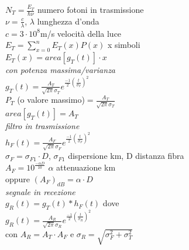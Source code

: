 \documentclass[a4paper]{article}
\begin{document}
\begin{multicols*}{3}
$N_T = \frac{E_T}{\hbar\nu}$ numero fotoni in trasmissione \\
$\nu = \frac{c}{\lambda}$, $\lambda$ lunghezza d'onda \\
$c=3\cdot10^8$m/s  velocità della luce \\
$E_T = \sum_{x=0}^{n}{E_T(x)P(x)}$ x simboli \\
$E_T(x) = area[g_T(t)]\cdot x$ \\
\textit{con potenza massima/varianza }\\
$g_T(t)=\frac{A_T}{\sqrt{2\pi}\sigma_T}e^{\frac{-1}{2}{(\frac{t}{\sigma_T})}^{2}}$
\\ $P_T$ (o valore massimo)$=\frac{A_T}{\sqrt{2\pi}\sigma_T}$ \\
$area[g_T(t)] = A_T$ \\
\textit{filtro in trasmissione }\\
$h_F(t)=\frac{A_F}{\sqrt{2\pi}\sigma_F}e^{\frac{-1}{2}{(\frac{t}{\sigma_F})}^{2}}$ \\
$\sigma_F=\sigma_{F1} \cdot D$, $\sigma_{F1}$ dispersione km, D distanza fibra \\
$A_F = 10^{\frac{-\alpha D}{10}}$ $\alpha$ attenuazione km \\
oppure ${(A_F)}_{dB}=\alpha\cdot D$ \\ 
\textit{segnale in recezione}\\ 
$g_R(t)=g_T(t)*h_F(t)$ dove \\
$g_R(t)=\frac{A_R}{\sqrt{2\pi}\sigma_R}e^{\frac{-1}{2}{(\frac{t}{\sigma_R})}^{2}}$
\\ con $A_R = A_T \cdot A_F$ e $\sigma_R = \sqrt{\sigma_F^2 + \sigma_T^2}$

\end{multicols*}
\end{document}
